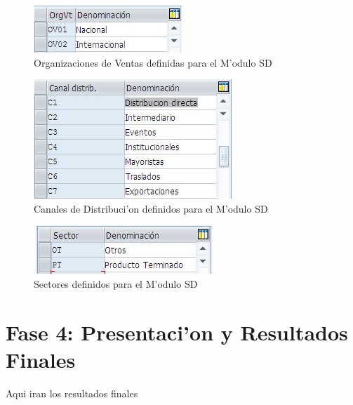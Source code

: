 \begin{figure}[htb]
\centering
\includegraphics[scale=0.65,type=jpg,ext=.jpg,read=.jpg]{figures/OrgVentas}
\caption{Organizaciones de Ventas definidas para el M'odulo SD}
\label{fig:orgventas}
\end{figure}
\begin{figure}[htb]
\centering
\includegraphics[scale=0.65,type=jpg,ext=.jpg,read=.jpg]{figures/CanalesDistribucion}
\caption{Canales de Distribuci'on definidos para el M'odulo SD}
\label{fig:canales}
\end{figure}
\begin{figure}[htb]
\centering
\includegraphics[scale=0.65,type=jpg,ext=.jpg,read=.jpg]{figures/Sectores}
\caption{Sectores definidos para el M'odulo SD}
\label{fig:sectores}
\end{figure}




\section{Fase 4: Presentaci'on y Resultados Finales}
Aqui iran los resultados finales